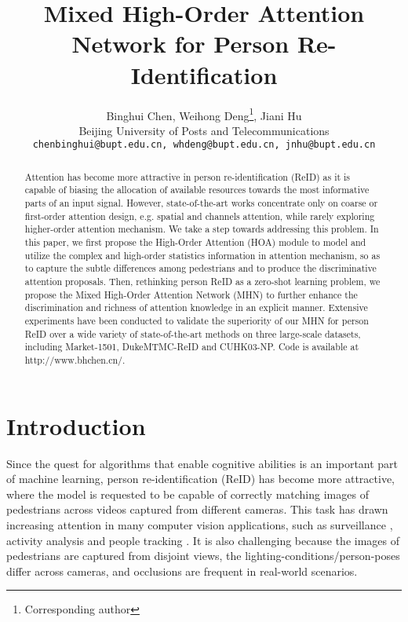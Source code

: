 \documentclass[10pt,twocolumn,letterpaper]{article}
\begin{document}
\title{Mixed High-Order Attention Network for Person Re-Identification}

\author{Binghui Chen, Weihong Deng\thanks{Corresponding author}, Jiani Hu\\
Beijing University of Posts and Telecommunications\\
{\tt\small chenbinghui@bupt.edu.cn, whdeng@bupt.edu.cn, jnhu@bupt.edu.cn}
}

\maketitle



\begin{abstract}
   Attention has become more attractive in person re-identification (ReID) as it is capable of biasing the allocation of available resources towards the most informative parts of an input signal. However, state-of-the-art works concentrate only on coarse or first-order attention design, e.g. spatial and channels attention, while rarely exploring higher-order attention mechanism. We take a step towards addressing this problem. In this paper, we first propose the High-Order Attention (HOA) module to model and utilize the complex and high-order statistics information in attention mechanism, so as to capture the subtle differences among pedestrians and to produce the discriminative attention proposals. Then, rethinking person ReID as a zero-shot learning problem, we propose the Mixed High-Order Attention Network (MHN) to further enhance the discrimination and richness of attention knowledge in an explicit manner.  Extensive experiments have been conducted to validate the superiority of our MHN for person ReID over a wide variety of state-of-the-art methods on three large-scale datasets, including Market-1501, DukeMTMC-ReID and CUHK03-NP.
   \textcolor[rgb]{1,0,0}{Code is available at http://www.bhchen.cn/}.
\end{abstract}

\section{Introduction}
Since the quest for algorithms that enable cognitive abilities is an important part of machine learning, person re-identification (ReID) has become more attractive, where the model is requested to be capable of correctly matching images of pedestrians across videos captured from different cameras. This task has drawn increasing attention in many computer vision applications, such as surveillance \cite{wang2013intelligent}, activity analysis \cite{loy2009multi,loy2010time} and people tracking \cite{yu2013harry,tang2017multiple}. It is also challenging because the images of pedestrians are captured from disjoint views, the lighting-conditions/person-poses differ across cameras, and occlusions are frequent in real-world scenarios.
\end{document}
